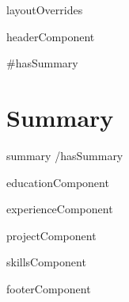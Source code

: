\documentclass[letterpaper,11pt]{article}
\begin{document}
{{{layoutOverrides}}}

{{{headerComponent}}}

{{#hasSummary}}
\section{Summary}
\vspace{2pt}
\small{
  {{summary}}
}
{{/hasSummary}}

{{{educationComponent}}}

{{{experienceComponent}}}

{{{projectComponent}}}

{{{skillsComponent}}}

{{{footerComponent}}}
\end{document}

